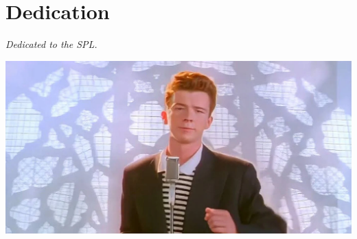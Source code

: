 \chapter{Dedication}

\begin{center}
\textit{Dedicated to the SPL.}

\hfill

\includegraphics[width=\textwidth]{placeholder.png}
\end{center}